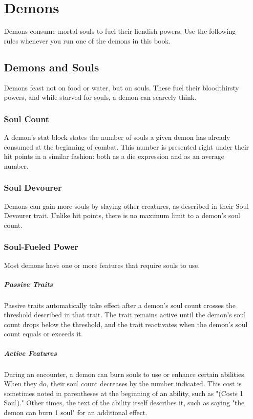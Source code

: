 \documentclass[10pt,a4paper,twoside,bg=print,twocolumn,openany,nodeprecatedcode]{dndbook}
\begin{document}
\section{Demons}
Demons consume mortal souls to fuel their fiendish powers. Use the following rules whenever you run one of the demons in this book.

\subsection{Demons and Souls}
Demons feast not on food or water, but on souls. These fuel their bloodthirsty powers, and while starved for souls, a demon can scarcely think.

\subsubsection{Soul Count}
A demon's stat block states the number of souls a given demon has already consumed at the beginning of combat. This number is presented right under their hit points in a similar fashion: both as a die expression and as an average number.

\subsubsection{Soul Devourer}
Demons can gain more souls by slaying other creatures, as described in their Soul Devourer trait. Unlike hit points, there is no maximum limit to a demon's soul count.

\subsubsection{Soul-Fueled Power}
Most demons have one or more features that require souls to use.

\subparagraph{Passive Traits}
Passive traits automatically take effect after a demon's soul count crosses the threshold described in that trait. The trait remains active until the demon's soul count drops below the threshold, and the trait reactivates when the demon's soul count equals or exceeds it.

\subparagraph{Active Features}
During an encounter, a demon can burn souls to use or enhance certain abilities. When they do, their soul count decreases by the number indicated. This cost is sometimes noted in parentheses at the beginning of an ability, such as "(Costs 1 Soul)." Other times, the text of the ability itself describes it, such as saying "the demon can burn 1 soul" for an additional effect.
\end{document}
